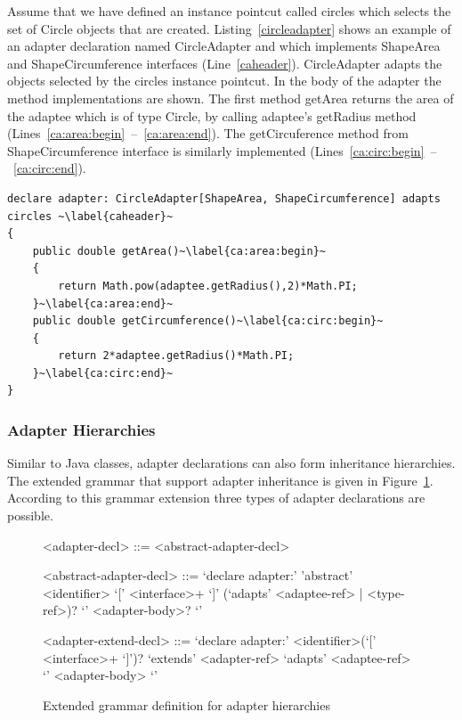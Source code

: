 \documentclass{acm_proc_article-sp}
\begin{document}
Assume that we have defined an instance pointcut called \textsf{circles} which selects the set of \textsf{Circle} objects that are created. Listing~\ref{circleadapter} shows an example of an adapter declaration named \textsf{CircleAdapter} and which implements \textsf{ShapeArea} and \textsf{ShapeCircumference} interfaces (Line~\ref{caheader}). \textsf{CircleAdapter} adapts the objects selected by the \textsf{circles} instance pointcut. In the body of the adapter the method implementations are shown. The first method \textsf{getArea} returns the area of the \textsf{adaptee} which is of type \textsf{Circle}, by calling \textsf{adaptee}'s \textsf{getRadius} method (Lines~\ref{ca:area:begin}~--~\ref{ca:area:end}). The \textsf{getCircuference} method from \textsf{ShapeCircumference} interface is similarly implemented (Lines~\ref{ca:circ:begin}~--~\ref{ca:circ:end}).



\begin{lstlisting}[float, label={circleadapter}, caption={The adapter declaration for \textsf{Circle} objects}]
declare adapter: CircleAdapter[ShapeArea, ShapeCircumference] adapts circles ~\label{caheader}~
{
	public double getArea()~\label{ca:area:begin}~
	{
		return Math.pow(adaptee.getRadius(),2)*Math.PI;
	}~\label{ca:area:end}~
	public double getCircumference()~\label{ca:circ:begin}~
	{
		return 2*adaptee.getRadius()*Math.PI;
	}~\label{ca:circ:end}~
}
\end{lstlisting} 



\subsubsection{Adapter Hierarchies}

Similar to Java classes, adapter declarations can also form inheritance hierarchies. The extended grammar that support adapter inheritance is given in Figure~\ref{adaphier}. According to this grammar extension three types of adapter declarations are possible. 

\begin{figure}[h!]
\begin{grammar}
<adapter-decl> ::= <abstract-adapter-decl>  

<abstract-adapter-decl> ::= `declare adapter:' 'abstract' <identifier> `[' <interface>+ `]'  (`adapts' <adaptee-ref> | <type-ref>)? `{' <adapter-body>? `}'

<adapter-extend-decl> ::= `declare adapter:' <identifier>(`[' <interface>+ `]')? `extends' <adapter-ref> `adapts' <adaptee-ref> `{' <adapter-body> `}'

\end{grammar}
\caption{Extended grammar definition for adapter hierarchies}
\label{adaphier}
\end{figure}
\end{document}
